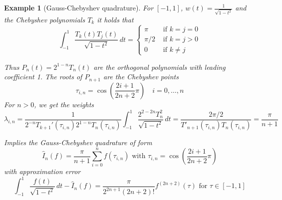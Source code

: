 \documentclass[a4paper]{article}
\newcounter{lecref}[section]
\numberwithin{lecref}{section}
\theoremstyle{break}
\newtheorem{example}[lecref]{Example}
\begin{document}
\begin{example}[Gauss-Chebyshev quadrature]
  For $[-1,1]$, $w(t) = \frac{1}{\sqrt{1 - t^2}}$ and the Chebyshev polynomials $T_k$ it holds that
  \[
    \int_{-1}^1 \frac{T_k(t) T_j(t)}{\sqrt{1 - t^2}} \, dt
    = \begin{cases}
      \pi & \text{ if } k = j = 0 \\
      \pi/2 & \text{ if } k = j > 0 \\
      0 & \text{ if } k \neq j
    \end{cases}
  \]

  Thus $P_n(t) = 2^{1-n} T_n(t)$ are the orthogonal polynomials with leading coefficient 1. The roots of $P_{n+1}$ are the Chebyshev points
  \[ \tau_{i,n} = \cos\left(\frac{2i+1}{2n+2} \pi\right) \quad i = 0,\dots,n \]
  For $n > 0$, we get the weights
  \[ \lambda_{i,n} = \frac{1}{2^{-n} T_{k+1}'(\tau_{i,n}) 2^{1-n} T_n(\tau_{i,n})} \int_{-1}^1 \frac{2^{2 - 2n} T_n^2}{\sqrt{1 - t^2}} \, dt = \frac{2\pi/2}{T'_{n+1}(\tau_{i,n}) T_n(\tau_{i,n})} = \frac{\pi}{n+1} \]

  Implies the Gauss-Chebyshev quadrature of form
  \[ \hat{I}_n(f) = \frac{\pi}{n+1} \sum_{i=0}^n f(\tau_{i,n}) \text{ with } \tau_{i,n} = \cos\left(\frac{2i+1}{2n+2} \pi\right) \]
  with approximation error
  \[ \int_{-1}^1 \frac{f(t)}{\sqrt{1 - t^2}} \, dt - \hat{I}_n(f) = \frac{\pi}{2^{2n+1} (2n+2)!} f^{(2n+2)}(\tau) \text{ for } \tau \in [-1,1] \]
\end{example}

\printindex
\end{document}
